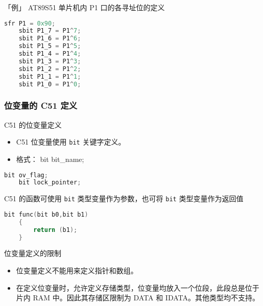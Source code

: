 \documentclass{beamer}
\begin{document}
\begin{frame}[fragile]{「例」 AT89S51 单片机内 P1 口的各寻址位的定义}
    \pause

    \begin{lstlisting}[language=C]
    sfr P1 = 0x90;
    sbit P1_7 = P1^7;
    sbit P1_6 = P1^6;
    sbit P1_5 = P1^5;
    sbit P1_4 = P1^4;
    sbit P1_3 = P1^3;
    sbit P1_2 = P1^2;
    sbit P1_1 = P1^1;
    sbit P1_0 = P1^0;
    \end{lstlisting}
\end{frame}

\subsubsection{位变量的 C51 定义}

\begin{frame}[fragile]{C51 的位变量定义}
    \begin{itemize}

        \item
            C51 位变量使用 \texttt{bit} 关键字定义。
        \item
            格式： bit bit\_name;
    \end{itemize}

    \begin{lstlisting}[language=C]
    bit ov_flag;
    bit lock_pointer;
    \end{lstlisting}
\end{frame}

\begin{frame}[fragile]{C51 的函数可使用 \texttt{bit} 类型变量作为参数，也可将 \texttt{bit} 类型变量作为返回值}
    \begin{lstlisting}[language=C]
    bit func(bit b0,bit b1)
    {
        return (b1);
    }
    \end{lstlisting}
\end{frame}

\begin{frame}{位变量定义的限制}
    \begin{itemize}

        \item
            位变量定义不能用来定义指针和数组。
        \item
            在定义位变量时，允许定义存储类型，位变量均放入一个位段，此段总是位于片内
            RAM 中。因此其存储区限制为 DATA 和 IDATA。其他类型均不支持。
    \end{itemize}
\end{frame}
\end{document}
